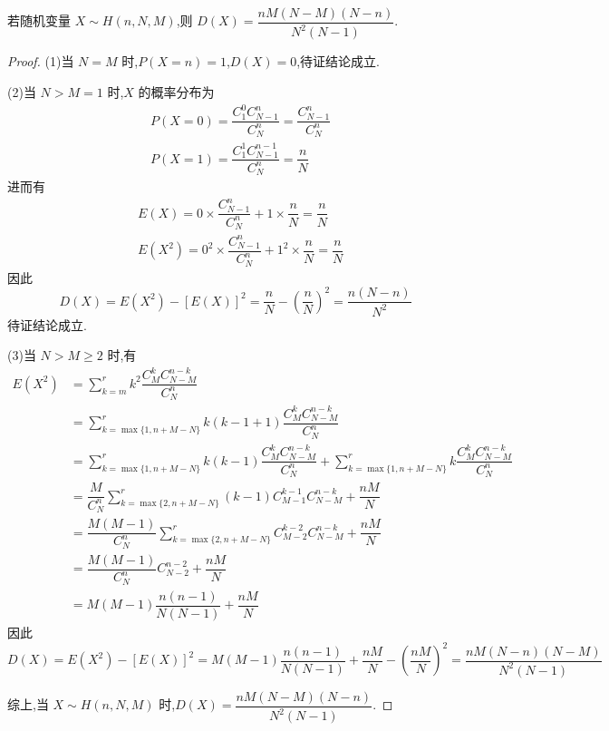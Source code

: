 \begin{conclusion}
    \indent 若随机变量 $X \sim H(n,N,M)$,则 $D(X) = \dfrac{nM(N-M)(N-n)}{N^2 (N-1)}$.
\end{conclusion}

\begin{proof}
    (1)当 $N=M$ 时,$P(X=n)=1$,$D(X)=0$,待证结论成立.

    (2)当 $N>M=1$ 时,$X$ 的概率分布为
    $$
    \begin{aligned}
        & P(X=0) = \dfrac{C_1^0 C_{N-1}^n}{C_N^n} = \dfrac{C_{N-1}^n}{C_N^n} \\
        & P(X=1) = \dfrac{C_1^1 C_{N-1}^{n-1}}{C_N^n} = \dfrac{n}{N}
    \end{aligned}
    $$
    进而有
    $$
    \begin{aligned}
        & E(X) = 0 \times \dfrac{C_{N-1}^n}{C_N^n} + 1 \times \dfrac{n}{N} = \dfrac{n}{N} \\
        & E(X^2) = 0^2 \times \dfrac{C_{N-1}^n}{C_N^n} + 1^2 \times \dfrac{n}{N} = \dfrac{n}{N}
    \end{aligned}
    $$
    因此
    $$
    D(X) = E(X^2) - [E(X)]^2 = \dfrac{n}{N} - \left( \dfrac{n}{N} \right)^2 = \dfrac{n(N-n)}{N^2}
    $$
    待证结论成立.
    
    (3)当 $N > M \geqslant 2$ 时,有
    $$
    \begin{aligned}
        E(X^2) &= \sum_{k=m}^{r} k^2 \dfrac{C_M^k C_{N-M}^{n-k}}{C_N^n} \\
        &= \sum_{k=\max\{ 1, n+M-N \}}^{r} k(k-1+1) \dfrac{C_M^k C_{N-M}^{n-k}}{C_N^n} \\
        &= \sum_{k=\max\{ 1, n+M-N \}}^{r} k(k-1) \dfrac{C_M^k C_{N-M}^{n-k}}{C_N^n} + \sum_{k=\max\{ 1, n+M-N \}}^{r} k \dfrac{C_M^k C_{N-M}^{n-k}}{C_N^n} \\
        &= \dfrac{M}{C_N^n} \sum_{k=\max\{ 2, n+M-N \}}^{r} (k-1) C_{M-1}^{k-1} C_{N-M}^{n-k} + \dfrac{nM}{N} \\
        &= \dfrac{M(M-1)}{C_N^n} \sum_{k=\max\{ 2, n+M-N \}}^{r} C_{M-2}^{k-2} C_{N-M}^{n-k} + \dfrac{nM}{N} \\
        &= \dfrac{M(M-1)}{C_N^n} C_{N-2}^{n-2} + \dfrac{nM}{N} \\
        &= M(M-1) \dfrac{n(n-1)}{N(N-1)} + \dfrac{nM}{N}
    \end{aligned}
    $$
    因此
    $$
    D(X) = E(X^2) - [E(X)]^2 = M(M-1) \dfrac{n(n-1)}{N(N-1)} + \dfrac{nM}{N} - \left( \dfrac{nM}{N} \right)^2 = \dfrac{nM(N-n)(N-M)}{N^2 (N-1)}
    $$

    综上,当 $X \sim H(n,N,M)$ 时,$D(X) = \dfrac{nM(N-M)(N-n)}{N^2 (N-1)}$.
\end{proof}

